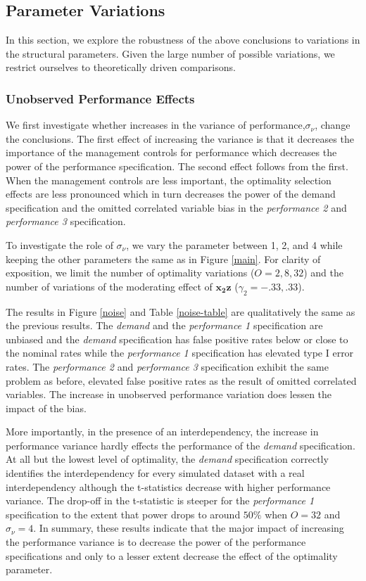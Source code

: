 \documentclass[12pt]{article}
\begin{document}
\subsection{Parameter Variations}\label{parameter-variations}

In this section, we explore the robustness of the above conclusions to variations in the structural parameters. Given the large number of possible variations, we restrict ourselves to theoretically driven comparisons.

\subsubsection{Unobserved Performance Effects}\label{unobserved-performance-effects}

We first investigate whether increases in the variance of performance,\(\sigma_{\nu}\), change the conclusions. The first effect of increasing the variance is that it decreases the importance of the management controls for performance which decreases the power of the performance specification. The second effect follows from the first. When the management controls are less important, the optimality selection effects are less pronounced which in turn decreases the power of the demand specification and the omitted correlated variable bias in the \emph{performance 2} and \emph{performance 3} specification.

To investigate the role of \(\sigma_{\nu}\), we vary the parameter between 1, 2, and 4 while keeping the other parameters the same as in Figure \ref{main}. For clarity of exposition, we limit the number of optimality variations (\(O = 2, 8, 32\)) and the number of variations of the moderating effect of \(\mathbf{x_2 z}\) (\(\gamma_2 = -.33, .33\)).

The results in Figure \ref{noise} and Table \ref{noise-table} are qualitatively the same as the previous results. The \emph{demand} and the \emph{performance 1} specification are unbiased and the \emph{demand} specification has false positive rates below or close to the nominal rates while the \emph{performance 1} specification has elevated type I error rates. The \emph{performance 2} and \emph{performance 3} specification exhibit the same problem as before, elevated false positive rates as the result of omitted correlated variables. The increase in unobserved performance variation does lessen the impact of the bias.

More importantly, in the presence of an interdependency, the increase in performance variance hardly effects the performance of the \emph{demand} specification. At all but the lowest level of optimality, the \emph{demand} specification correctly identifies the interdependency for every simulated dataset with a real interdependency although the t-statistics decrease with higher performance variance. The drop-off in the t-statistic is steeper for the \emph{performance 1} specification to the extent that power drops to around \(50\%\) when \(O = 32\) and \(\sigma_{\nu} = 4\). In summary, these results indicate that the major impact of increasing the performance variance is to decrease the power of the performance specifications and only to a lesser extent decrease the effect of the optimality parameter.
\end{document}
